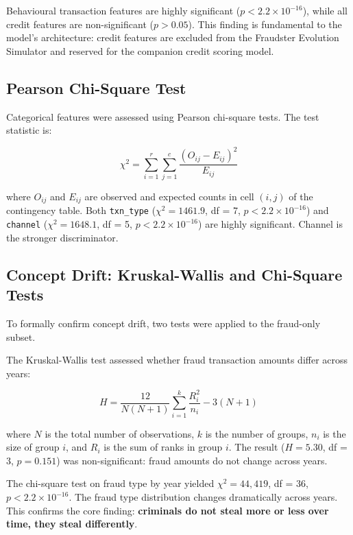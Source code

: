 \documentclass[12pt, a4paper]{article}
\begin{document}
Behavioural transaction features are highly significant ($p < 2.2 \times 10^{-16}$), while all credit features are non-significant ($p > 0.05$). This finding is fundamental to the model's architecture: credit features are excluded from the Fraudster Evolution Simulator and reserved for the companion credit scoring model.

\subsection{Pearson Chi-Square Test}

Categorical features were assessed using Pearson chi-square tests. The test statistic is:

\begin{equation}
    \chi^2 = \sum_{i=1}^{r} \sum_{j=1}^{c} \frac{(O_{ij} - E_{ij})^2}{E_{ij}}
    \label{eq:chisquare}
\end{equation}

where $O_{ij}$ and $E_{ij}$ are observed and expected counts in cell $(i, j)$ of the contingency table. Both \texttt{txn\_type} ($\chi^2 = 1461.9$, df = 7, $p < 2.2 \times 10^{-16}$) and \texttt{channel} ($\chi^2 = 1648.1$, df = 5, $p < 2.2 \times 10^{-16}$) are highly significant. Channel is the stronger discriminator.

\subsection{Concept Drift: Kruskal-Wallis and Chi-Square Tests}

To formally confirm concept drift, two tests were applied to the fraud-only subset.

The Kruskal-Wallis test assessed whether fraud transaction amounts differ across years:

\begin{equation}
    H = \frac{12}{N(N+1)} \sum_{i=1}^{k} \frac{R_i^2}{n_i} - 3(N+1)
    \label{eq:kruskal}
\end{equation}

where $N$ is the total number of observations, $k$ is the number of groups, $n_i$ is the size of group $i$, and $R_i$ is the sum of ranks in group $i$. The result ($H = 5.30$, df = 3, $p = 0.151$) was non-significant: fraud amounts do not change across years.

The chi-square test on fraud type by year yielded $\chi^2 = 44{,}419$, df = 36, $p < 2.2 \times 10^{-16}$. The fraud type distribution changes dramatically across years. This confirms the core finding: \textbf{criminals do not steal more or less over time, they steal differently}.
\end{document}
